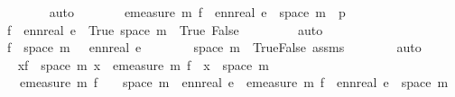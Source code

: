 \begin{isabellebody}
\ \ \ \ \ \ \isamarkupfalse%
\ auto\isanewline
\ \ \ \ \isamarkupfalse%
\ \isamarkupfalse%
\ {\isachardoublequoteopen}emeasure\ m\ {\isacharparenleft}{\kern0pt}f\ {\isacharminus}{\kern0pt}{\isacharbackquote}{\kern0pt}\ {\isacharbraceleft}{\kern0pt}ennreal\ e{\isacharbraceright}{\kern0pt}\ {\isasyminter}\ space\ m{\isacharparenright}{\kern0pt}\ {\isacharequal}{\kern0pt}\ p{}{\isachardoublequoteclose}\isanewline
\ \ \ \ \ \ \isamarkupfalse%
\ {\isacartoucheopen}f\ {\isacharminus}{\kern0pt}{\isacharbackquote}{\kern0pt}\ {\isacharbraceleft}{\kern0pt}ennreal\ e{\isacharbraceright}{\kern0pt}\ {\isacharequal}{\kern0pt}\ {\isacharbraceleft}{\kern0pt}True{\isacharbraceright}{\kern0pt}{\isacartoucheclose}\ {\isacartoucheopen}space\ m\ {\isacharequal}{\kern0pt}\ {\isacharbraceleft}{\kern0pt}True{\isacharcomma}{\kern0pt}\ False{\isacharbraceright}{\kern0pt}{\isacartoucheclose}\ \isanewline
\ \ \ \ \ \ \isamarkupfalse%
\ auto\isanewline
\ \ \ \ \isamarkupfalse%
\ {\isachardoublequoteopen}f\ {\isacharbackquote}{\kern0pt}\ space\ m\ {\isacharequal}{\kern0pt}\ {\isacharbraceleft}{\kern0pt}{}{\isacharcomma}{\kern0pt}\ ennreal\ e{\isacharbraceright}{\kern0pt}{\isachardoublequoteclose}\isanewline
\ \ \ \ \ \ \isamarkupfalse%
\ {\isacartoucheopen}space\ m\ {\isacharequal}{\kern0pt}\ {\isacharbraceleft}{\kern0pt}True{\isacharcomma}{\kern0pt}False{\isacharbraceright}{\kern0pt}{\isacartoucheclose}\ assms{\isacharparenleft}{\kern0pt}{}{\isacharparenright}{\kern0pt}\isanewline
\ \ \ \ \ \ \isamarkupfalse%
\ auto\isanewline
\ \ \ \ \isamarkupfalse%
\ \isamarkupfalse%
\ {\isachardoublequoteopen}{\isacharparenleft}{\kern0pt}{\isasymSum}x{\isasymin}f\ {\isacharbackquote}{\kern0pt}\ space\ m{\isachardot}{\kern0pt}\ x\ {\isacharasterisk}{\kern0pt}\ emeasure\ m\ {\isacharparenleft}{\kern0pt}f\ {\isacharminus}{\kern0pt}{\isacharbackquote}{\kern0pt}\ {\isacharbraceleft}{\kern0pt}x{\isacharbraceright}{\kern0pt}\ {\isasyminter}\ space\ m{\isacharparenright}{\kern0pt}{\isacharparenright}{\kern0pt}\isanewline
{\isacharequal}{\kern0pt}\ {}\ {\isacharasterisk}{\kern0pt}\ emeasure\ m\ {\isacharparenleft}{\kern0pt}f\ {\isacharminus}{\kern0pt}{\isacharbackquote}{\kern0pt}\ {\isacharbraceleft}{\kern0pt}{}{\isacharbraceright}{\kern0pt}\ {\isasyminter}\ space\ m{\isacharparenright}{\kern0pt}\ {\isacharplus}{\kern0pt}\ ennreal\ e\ {\isacharasterisk}{\kern0pt}\ emeasure\ m\ {\isacharparenleft}{\kern0pt}f\ {\isacharminus}{\kern0pt}{\isacharbackquote}{\kern0pt}\ {\isacharbraceleft}{\kern0pt}ennreal\ e{\isacharbraceright}{\kern0pt}\ {\isasyminter}\ space\ m{\isacharparenright}{\kern0pt}{\isachardoublequoteclose}\isanewline

\end{isabellebody}
